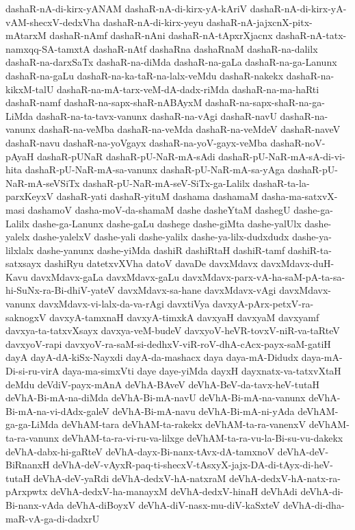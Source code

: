 {dashaR-nA-di-kirx-yANAM
dashaR-nA-di-kirx-yA-kAriV
dashaR-nA-di-kirx-yA-vAM-shecxV-dedxVha
dashaR-nA-di-kirx-yeyu
dashaR-nA-jajxcnX-pitx-mAtarxM
dashaR-nAmf
dashaR-nAni
dashaR-nA-tApxrXjacnx
dashaR-nA-tatx-namxqq-SA-tamxtA
dashaR-nAtf
dashaRna
dashaRnaM
dashaR-na-dalilx
dashaR-na-darxSaTx
dashaR-na-diMda
dashaR-na-gaLa
dashaR-na-ga-Lanunx
dashaR-na-gaLu
dashaR-na-ka-taR-na-lalx-veMdu
dashaR-nakekx
dashaR-na-kikxM-talU
dashaR-na-mA-tarx-veM-dA-dadx-riMda
dashaR-na-ma-haRti
dashaR-namf
dashaR-na-sapx-shaR-nABAyxM
dashaR-na-sapx-shaR-na-ga-LiMda
dashaR-na-ta-tavx-vanunx
dashaR-na-vAgi
dashaR-navU
dashaR-na-vanunx
dashaR-na-veMba
dashaR-na-veMda
dashaR-na-veMdeV
dashaR-naveV
dashaR-navu
dashaR-na-yoVgayx
dashaR-na-yoV-gayx-veMba
dashaR-noV-pAyaH
dashaR-pUNaR
dashaR-pU-NaR-mA-sAdi
dashaR-pU-NaR-mA-sA-di-vi-hita
dashaR-pU-NaR-mA-sa-vanunx
dashaR-pU-NaR-mA-sa-yAga
dashaR-pU-NaR-mA-seVSiTx
dashaR-pU-NaR-mA-seV-SiTx-ga-Lalilx
dashaR-ta-la-parxKeyxV
dashaR-yati
dashaR-yituM
dashama
dashamaM
dasha-ma-satxvX-masi
dashamoV
dasha-moV-da-shamaM
dashe
dasheYtaM
dashegU
dashe-ga-Lalilx
dashe-ga-Lanunx
dashe-gaLu
dashege
dashe-giMta
dashe-yalUlx
dashe-yalelx
dashe-yalelxV
dashe-yali
dashe-yalilx
dashe-ya-lilx-dudxdudx
dashe-ya-lilxlalx
dashe-yanunx
dashe-yiMda
dashiR
dashiRtaH
dashiR-tamf
dashiR-ta-satxsayx
dashiRyu
datetxvXVha
datoV
davaDe
davxMdavx
davxMdavx-duH-Kavu
davxMdavx-gaLa
davxMdavx-gaLu
davxMdavx-parx-vA-ha-saM-pA-ta-sa-hi-SuNx-ra-Bi-dhiV-yateV
davxMdavx-sa-hane
davxMdavx-vAgi
davxMdavx-vanunx
davxMdavx-vi-lalx-da-va-rAgi
davxtiVya
davxyA-pArx-petxV-ra-saknogxV
davxyA-tamxnaH
davxyA-timxkA
davxyaH
davxyaM
davxyamf
davxya-ta-tatxvXsayx
davxya-veM-budeV
davxyoV-heVR-tovxV-niR-va-taRteV
davxyoV-rapi
davxyoV-ra-saM-si-dedhxV-viR-roV-dhA-cAcx-payx-saM-gatiH
dayA
dayA-dA-kiSx-Nayxdi
dayA-da-mashacx
daya
daya-mA-Didudx
daya-mA-Di-si-ru-virA
daya-ma-simxVti
daye
daye-yiMda
dayxH
dayxnatx-va-tatxvXtaH
deMdu
deVdiV-payx-mAnA
deVhA-BAveV
deVhA-BeV-da-tavx-heV-tutaH
deVhA-Bi-mA-na-diMda
deVhA-Bi-mA-navU
deVhA-Bi-mA-na-vanunx
deVhA-Bi-mA-na-vi-dAdx-galeV
deVhA-Bi-mA-navu
deVhA-Bi-mA-ni-yAda
deVhAM-ga-ga-LiMda
deVhAM-tara
deVhAM-ta-rakekx
deVhAM-ta-ra-vanenxV
deVhAM-ta-ra-vanunx
deVhAM-ta-ra-vi-ru-va-lilxge
deVhAM-ta-ra-vu-la-Bi-su-vu-dakekx
deVhA-dabx-hi-gaRteV
deVhA-dayx-Bi-nanx-tAvx-dA-tamxnoV
deVhA-deV-BiRnanxH
deVhA-deV-vAyxR-paq-ti-shecxV-tAsxyX-jajx-DA-di-tAyx-di-heV-tutaH
deVhA-deV-yaRdi
deVhA-dedxV-hA-natxraM
deVhA-dedxV-hA-natx-ra-pArxpwtx
deVhA-dedxV-ha-manayxM
deVhA-dedxV-hinaH
deVhAdi
deVhA-di-Bi-nanx-vAda
deVhA-diBoyxV
deVhA-diV-nasx-mu-diV-kaSxteV
deVhA-di-dha-maR-vA-ga-di-dadxrU
}
